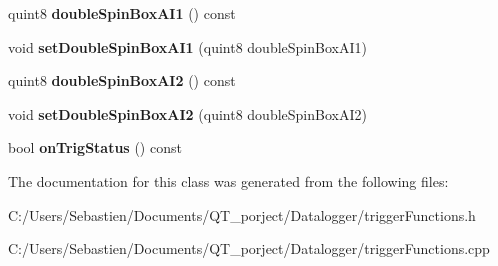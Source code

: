 \begin{DoxyCompactItemize}
quint8 {\bfseries double\+Spin\+Box\+A\+I1} () const
\item 
\mbox{\label{class_trigger_functions_a98dccf3ffc04858a2592041f2416e565}} 
void {\bfseries set\+Double\+Spin\+Box\+A\+I1} (quint8 double\+Spin\+Box\+A\+I1)
\item 
\mbox{\label{class_trigger_functions_a4a9ba2fd7c24f1492364f33e757fcb64}} 
quint8 {\bfseries double\+Spin\+Box\+A\+I2} () const
\item 
\mbox{\label{class_trigger_functions_a4ece884b0bf22119377d2f70bbfa54bb}} 
void {\bfseries set\+Double\+Spin\+Box\+A\+I2} (quint8 double\+Spin\+Box\+A\+I2)
\item 
\mbox{\label{class_trigger_functions_a9ea48e292e85152099879ae11bbe93f6}} 
bool {\bfseries on\+Trig\+Status} () const
\end{DoxyCompactItemize}


The documentation for this class was generated from the following files\+:\begin{DoxyCompactItemize}
\item 
C\+:/\+Users/\+Sebastien/\+Documents/\+Q\+T\+\_\+porject/\+Datalogger/trigger\+Functions.\+h\item 
C\+:/\+Users/\+Sebastien/\+Documents/\+Q\+T\+\_\+porject/\+Datalogger/trigger\+Functions.\+cpp\end{DoxyCompactItemize}
